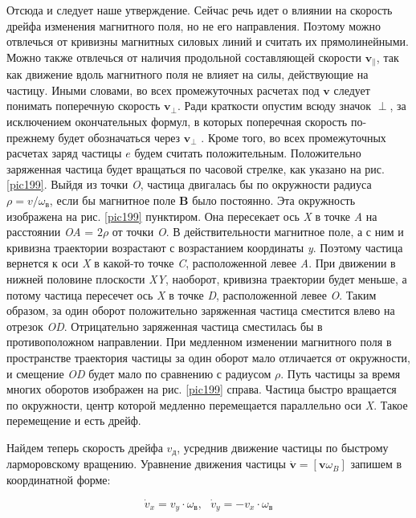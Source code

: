 Отсюда и следует наше утверждение.
Сейчас речь идет о влиянии на скорость дрейфа изменения магнитного поля, но не его направления. 
Поэтому можно отвлечься от кривизны магнитных силовых линий и считать их прямолинейными. 
Можно также отвлечься от наличия продольной составляющей скорости $\textbf{v}_{\parallel}$, так как движение вдоль магнитного поля не влияет на силы, действующие на частицу. 
Иными словами, во всех промежуточных расчетах под $\textbf{v}$ следует понимать поперечную скорость $\textbf{v}_{\perp}$. 
Ради краткости опустим всюду значок $\perp$, за исключением окончательных формул, в которых поперечная скорость по-прежнему будет обозначаться через $\textbf{v}_{\perp}$ . 
Кроме того, во всех промежуточных расчетах заряд частицы $e$ будем считать положительным.
Положительно заряженная частица будет вращаться по часовой стрелке, как указано на рис. \ref{pic199}. Выйдя из точки \textit{O}, частица двигалась бы по окружности радиуса $\rho = \textit{v} / \omega_в$, если бы магнитное поле \textbf{B} было постоянно. 
Эта окружность изображена на рис. \ref{pic199} пунктиром. Она пересекает ось \textit{X} в точке \textit{A} на расстоянии \textit{OA} = $2\rho$ от точки \textit{O}. 
В действительности магнитное поле, а с ним и кривизна траектории возрастают с возрастанием координаты \textit{y}. 
Поэтому частица вернется к оси \textit{X} в какой-то точке \textit{C}, расположенной левее \textit{A}. 
При движении в нижней половине плоскости \textit{XY}, наоборот, кривизна траектории будет меньше, а потому частица пересечет ось \textit{X} в точке \textit{D}, расположенной левее \textit{O}. 
Таким образом, за один оборот положительно заряженная частица сместится влево на отрезок \textit{OD}.
Отрицательно заряженная частица сместилась бы в противоположном направлении. 
При медленном изменении магнитного поля в пространстве траектория частицы за один оборот мало отличается от окружности, и смещение \textit{OD} будет мало по сравнению с радиусом $\rho$. 
Путь частицы за время многих оборотов изображен на рис. \ref{pic199} справа.
Частица быстро вращается по окружности, центр которой медленно перемещается параллельно оси \textit{X}. 
Такое перемещение и есть дрейф. 

Найдем теперь скорость дрейфа $v_д$, усреднив движение частицы по быстрому ларморовскому вращению. 
Уравнение движения частицы $\dot{\textbf{v}} = \left[ \textbf{v} \omega_B \right]$ запишем в координатной форме:

\begin{equation*}
    \dot v_x  = v_y \cdot \omega_в, ~~~ \dot v_y = -v_x \cdot \omega_в
\end{equation*}

